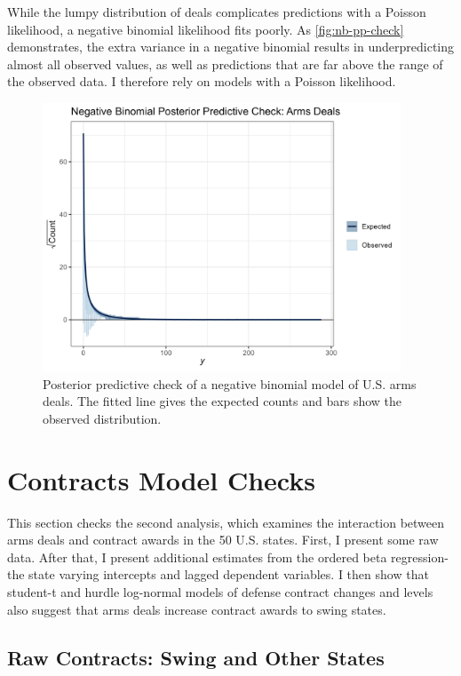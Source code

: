 \documentclass[12pt]{article}
\begin{document}
While the lumpy distribution of deals complicates predictions with a Poisson likelihood, a negative binomial likelihood fits poorly. 
As \autoref{fig:nb-pp-check} demonstrates, the extra variance in a negative binomial results in underpredicting almost all observed values, as well as predictions that are far above the range of the observed data. 
I therefore rely on models with a Poisson likelihood. 


\begin{figure}[htpb]
	\centering
		\includegraphics[width=0.95\textwidth]{nb-pp-check.png}
	\caption{Posterior predictive check of a negative binomial model of U.S. arms deals. The fitted line gives the expected counts and bars show the observed distribution.}
	\label{fig:nb-pp-check}
\end{figure}

\newpage

\section{Contracts Model Checks} 

This section checks the second analysis, which examines the interaction between arms deals and contract awards in the 50 U.S. states. 
First, I present some raw data. 
After that, I present additional estimates from the ordered beta regression- the state varying intercepts and lagged dependent variables. 
I then show that student-t and hurdle log-normal models of defense contract changes and levels also suggest that arms deals increase contract awards to swing states. 

\subsection{Raw Contracts: Swing and Other States}
\end{document}
